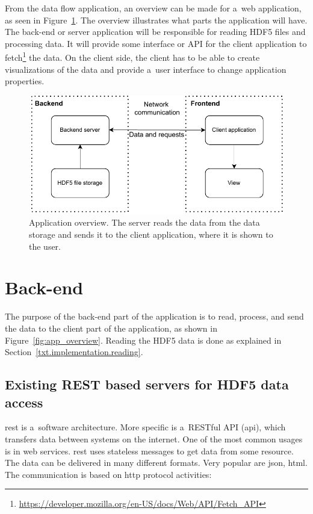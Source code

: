 From the data flow application, an overview can be made for a~web application, as seen in Figure~\ref{fig:app_overview1}. The overview illustrates what parts the application will have. The back-end or server application will be responsible for reading HDF5 files and processing data. It will provide some interface or API for the client application to fetch\footnote{\url{https://developer.mozilla.org/en-US/docs/Web/API/Fetch\_API}} the data. On the client side, the client has to be able to create visualizations of the data and provide a~user interface to change application properties.

\begin{figure}
    \centering
    \includegraphics{pdf/appstack_general.drawio.pdf}
    \caption{Application overview. The server reads the data from the data storage and sends it to the client application, where it is shown to the user.}
    \label{fig:app_overview1}
\end{figure}


\section{Back-end}\label{txt.design.backend}

The purpose of the back-end part of the application is to read, process, and send the data to the client part of the application, as shown in Figure~\ref{fig:app_overview}. Reading the HDF5 data is done as explained in Section~\ref{txt.implementation.reading}.


\subsection{Existing REST based servers for HDF5 data access}\label{txt.design.rest}

\ac{rest} is a~software architecture. More specific is a~RESTful API (\ac{api}), which transfers data between systems on the internet. One of the most common usages is in web services. \ac{rest} uses stateless messages to get data from some resource. The data can be delivered in many different formats. Very popular are \ac{json}, \ac{html}. The communication is based on \ac{http} protocol activities:

